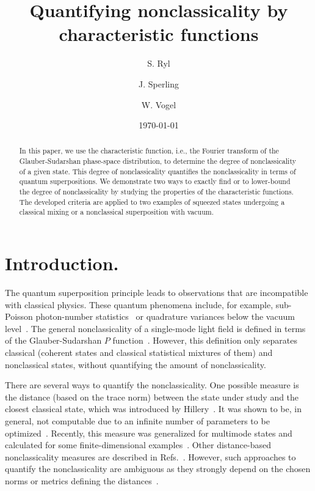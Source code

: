 \documentclass[aps,pra,twocolumn,showpacs,superscriptaddress,10pt]{revtex4-1}
\begin{document}
\title{Quantifying nonclassicality by characteristic functions}

\author{S. Ryl}
\author{J. Sperling}
\author{W. Vogel}

\date{\today}

\begin{abstract}
	In this paper, we use the characteristic function, i.e., the Fourier transform of the Glauber-Sudarshan phase-space distribution, to determine the degree of nonclassicality of a given state.
	This degree of nonclassicality quantifies the nonclassicality in terms of quantum superpositions.
	We demonstrate two ways to exactly find or to lower-bound the degree of nonclassicality by studying the properties of the characteristic functions.
	The developed criteria are applied to two examples of squeezed states undergoing a classical mixing or a nonclassical superposition with vacuum.
\end{abstract}


\maketitle

\section{Introduction.}
	The quantum superposition principle leads to observations that are incompatible with classical physics.
	These quantum phenomena include, for example, sub-Poisson photon-number statistics~\cite{Mandel1979} or quadrature variances below the vacuum level~\cite{Slusher1985}.
	The general nonclassicality of a single-mode light field is defined in terms of the Glauber-Sudarshan $P$ function~\cite{Glauber1963,Sudarshan1963,Titulaer1965,Mandel1986}.
	However, this definition only separates classical (coherent states and classical statistical mixtures of them) and nonclassical states, without quantifying the amount of nonclassicality.

	There are several ways to quantify the nonclassicality.
	One possible measure is the distance (based on the trace norm) between the state under study and the closest classical state, which was introduced by Hillery~\cite{Hillery1987a}.
	It was shown to be, in general, not computable due to an infinite number of parameters to be optimized~\cite{Asboth2005}.
	Recently, this measure was generalized for multimode states and calculated for some finite-dimensional examples~\cite{Nair2017}.
	Other distance-based nonclassicality measures are described in Refs.~\cite{Wuensche2001,Dodonov2000,Marian2002,Marian2004}.
	However, such approaches to quantify the nonclassicality are ambiguous as they strongly depend on the chosen norms or metrics defining the distances~\cite{Sperling2015}.
\end{document}
